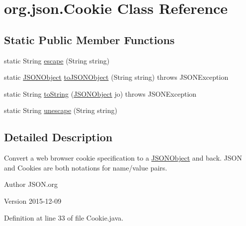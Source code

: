 \hypertarget{classorg_1_1json_1_1Cookie}{\section{org.\-json.\-Cookie Class Reference}
\label{classorg_1_1json_1_1Cookie}
}
\subsection*{Static Public Member Functions}
\begin{DoxyCompactItemize}
\item 
static String \hyperlink{classorg_1_1json_1_1Cookie_a4422021192515d995de2cef87d7836f2}{escape} (String string)
\item 
static \hyperlink{classorg_1_1json_1_1JSONObject}{J\-S\-O\-N\-Object} \hyperlink{classorg_1_1json_1_1Cookie_aaa6ae4ad2aa1db11eef24362049ce982}{to\-J\-S\-O\-N\-Object} (String string)  throws J\-S\-O\-N\-Exception 
\item 
static String \hyperlink{classorg_1_1json_1_1Cookie_a474a31a5f0b4f23d94b11c69e1d62cd1}{to\-String} (\hyperlink{classorg_1_1json_1_1JSONObject}{J\-S\-O\-N\-Object} jo)  throws J\-S\-O\-N\-Exception 
\item 
static String \hyperlink{classorg_1_1json_1_1Cookie_aea680b85e70e5a4bb34279c00b4c4bdd}{unescape} (String string)
\end{DoxyCompactItemize}


\subsection{Detailed Description}
Convert a web browser cookie specification to a \hyperlink{classorg_1_1json_1_1JSONObject}{J\-S\-O\-N\-Object} and back. J\-S\-O\-N and Cookies are both notations for name/value pairs. \begin{DoxyAuthor}{Author}
J\-S\-O\-N.\-org 
\end{DoxyAuthor}
\begin{DoxyVersion}{Version}
2015-\/12-\/09 
\end{DoxyVersion}


Definition at line 33 of file Cookie.\-java.



